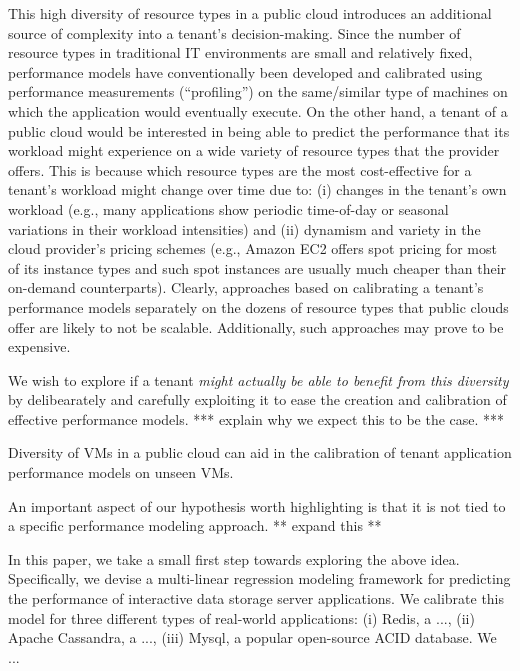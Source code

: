 \documentclass{acm_proc_article-sp}
\begin{document}
This high diversity of resource types in a public cloud introduces an additional source of complexity into a tenant's decision-making. Since the number of resource types in traditional IT environments are small and relatively fixed, performance models have conventionally been developed and calibrated using performance measurements (``profiling'') on the same/similar type of machines on which the application would eventually execute. On the other hand, a tenant of a public cloud would be interested in being able to predict the performance that its workload might experience on a wide variety of resource types that the provider offers. This is because which resource types are the most cost-effective for a tenant's workload might change over time due to: (i) changes in the tenant's own workload (e.g., many applications show periodic time-of-day or seasonal variations in their workload intensities) and (ii) dynamism and variety in the cloud provider's pricing schemes (e.g., Amazon EC2 offers spot pricing for most of its instance types and such spot instances are usually much cheaper than their on-demand counterparts). Clearly, approaches based on calibrating a tenant's performance models separately on the dozens of resource types that public clouds offer are likely to not be scalable. Additionally, such approaches may prove to be expensive. 

We wish to explore if a tenant {\em might actually be able to benefit from this diversity} by delibearately and carefully exploiting it to ease the creation and calibration of effective performance models. *** explain why we expect this to be the case. ***

 Diversity of VMs in a public cloud can aid in the calibration of tenant application performance models on unseen VMs. 

An important aspect of our hypothesis worth highlighting is that it is not tied to a specific performance modeling approach. ** expand this **

 In this paper, we take a small first step towards exploring the above idea. Specifically, we devise a multi-linear regression modeling framework for predicting the performance of interactive data storage server applications. We calibrate this model for three different types of real-world applications: (i) Redis, a ..., (ii) Apache Cassandra, a ..., (iii) Mysql, a popular open-source ACID database. We ... 
\end{document}
